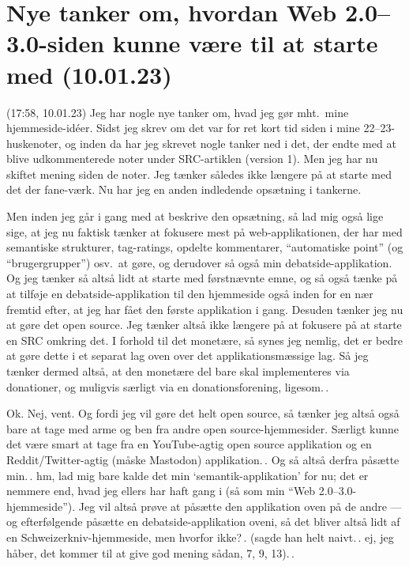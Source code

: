 \documentclass{report}
\begin{document}
\section{Nye tanker om, hvordan Web 2.0--3.0-siden kunne være til at starte med (10.01.23)}

(17:58, 10.01.23) Jeg har nogle nye tanker om, hvad jeg gør mht.\ mine hjemmeside-idéer. Sidst jeg skrev om det var for ret kort tid siden i mine 22--23-huskenoter, og inden da har jeg skrevet nogle tanker ned i det, der endte med at blive udkommenterede noter under SRC-artiklen (version 1). Men jeg har nu skiftet mening siden de noter. Jeg tænker således ikke længere på at starte med det der fane-værk. Nu har jeg en anden indledende opsætning i tankerne.

Men inden jeg går i gang med at beskrive den opsætning, så lad mig også lige sige, at jeg nu faktisk tænker at fokusere mest på web-applikationen, der har med semantiske strukturer, tag-ratings, opdelte kommentarer, ``automatiske point'' (og ``brugergrupper'') osv.\ at gøre, og derudover så også min debatside-applikation. Og jeg tænker så altså lidt at starte med førstnævnte emne, og så også tænke på at tilføje en debatside-applikation til den hjemmeside også inden for en nær fremtid efter, at jeg har fået den første applikation i gang. Desuden tænker jeg nu at gøre det open source. Jeg tænker altså ikke længere på at fokusere på at starte en SRC omkring det. I forhold til det monetære, så synes jeg nemlig, det er bedre at gøre dette i et separat lag oven over det applikationsmæssige lag. Så jeg tænker dermed altså, at den monetære del bare skal implementeres via donationer, og muligvis særligt via en donationsforening, ligesom.\,.

Ok. Nej, vent. Og fordi jeg vil gøre det helt open source, så tænker jeg altså også bare at tage med arme og ben fra andre open source-hjemmesider. Særligt kunne det være smart at tage fra en YouTube-agtig open source applikation og en Reddit/Twitter-agtig (måske Mastodon) applikation.\,. Og så altså derfra påsætte min.\,. hm, lad mig bare kalde det min `semantik-applikation' for nu; det er nemmere end, hvad jeg ellers har haft gang i (så som min ``Web 2.0--3.0-hjemmeside''). Jeg vil altså prøve at påsætte den applikation oven på de andre --- og efterfølgende påsætte en debatside-applikation oveni, så det bliver altså lidt af en Schweizerkniv-hjemmeside, men hvorfor ikke?\,. (sagde han helt naivt.\,. ej, jeg håber, det kommer til at give god mening sådan, 7, 9, 13).\,. 
\end{document}
